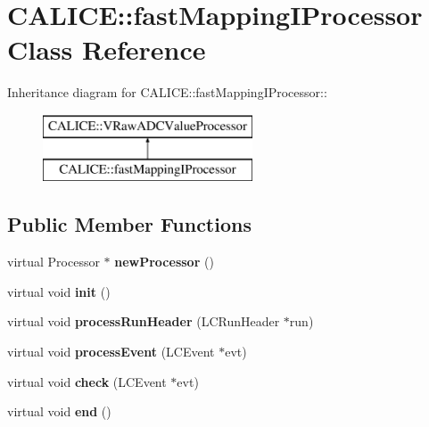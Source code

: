 \section{CALICE::fastMappingIProcessor Class Reference}
\label{classCALICE_1_1fastMappingIProcessor}
Inheritance diagram for CALICE::fastMappingIProcessor::\begin{figure}[H]
\begin{center}
\leavevmode
\includegraphics[height=2cm]{classCALICE_1_1fastMappingIProcessor}
\end{center}
\end{figure}
\subsection*{Public Member Functions}
\begin{DoxyCompactItemize}
\item 
virtual Processor $\ast$ {\bfseries newProcessor} ()\label{classCALICE_1_1fastMappingIProcessor_afd4a773dc4a748fd0b0f158145633c1e}

\item 
virtual void {\bfseries init} ()\label{classCALICE_1_1fastMappingIProcessor_a793005abfe7163deb7e8b358f8ba0b1c}

\item 
virtual void {\bfseries processRunHeader} (LCRunHeader $\ast$run)\label{classCALICE_1_1fastMappingIProcessor_a8b6727abbeb2da17115f390a0a98ad27}

\item 
virtual void {\bfseries processEvent} (LCEvent $\ast$evt)\label{classCALICE_1_1fastMappingIProcessor_a1a148ed309dc4126bebefd8b665e99da}

\item 
virtual void {\bfseries check} (LCEvent $\ast$evt)\label{classCALICE_1_1fastMappingIProcessor_a29d4f13330cd1f1a81348412eb9f019f}

\item 
virtual void {\bfseries end} ()\label{classCALICE_1_1fastMappingIProcessor_a68fd91bd4b382f7edf96c209be10afc3}

\end{DoxyCompactItemize}
